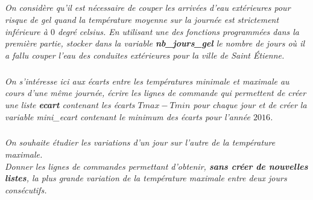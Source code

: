 \documentclass[10pt,fleqn]{article} %
\begin{document}
\ifprof
\begin{corrige}
\end{corrige}
\else
\fi

	
\subparagraph{} 
\textit{On considère qu'il est nécessaire de couper les arrivées d'eau 
	extérieures pour risque de gel quand la température moyenne sur la journée 
	est strictement inférieure à $0$ degré celsius. En utilisant une des fonctions 
	programmées dans la première partie, stocker dans la variable 
	\textbf{nb\_jours\_gel} le nombre de jours où il a fallu couper l'eau des 
	conduites extérieures pour la ville de Saint Étienne.}
	
\ifprof
\begin{corrige}
\end{corrige}
\else
\fi

\subparagraph{} 
\textit{On s'intéresse ici aux écarts entre les températures minimale et maximale au cours d'une même
 journée, écrire les lignes de commande qui permettent de créer une liste \textbf{ecart} 
 contenant les écarts $Tmax-Tmin$ pour chaque jour et de créer la variable mini\_ecart contenant 
 le minimum des écarts pour l'année $2016$.}

\ifprof
\begin{corrige}
\end{corrige}
\else
\fi
 
 \subparagraph{} 
\textit{On souhaite étudier les variations d'un jour sur l'autre de la température maximale.\\
 Donner les lignes de commandes permettant d'obtenir, \textbf{sans créer de nouvelles listes}, 
 la plus grande variation de la température maximale entre deux jours consécutifs.}

\ifprof
\begin{corrige}
\end{corrige}
\else
\fi
 
\end{document}
